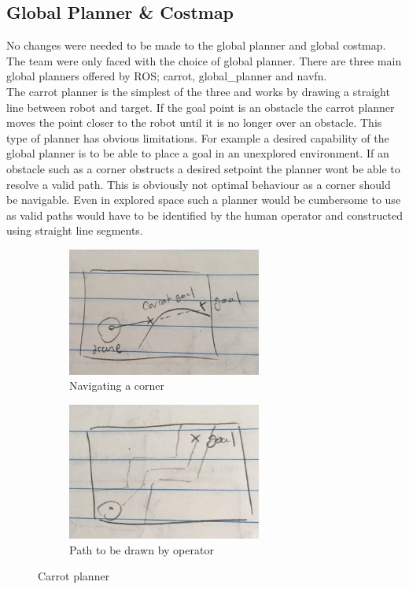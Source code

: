 \documentclass[capstone_report.tex]{subfiles}
\begin{document}
\subsection{Global Planner \& Costmap}

No changes were needed to be made to the global planner and global costmap.  The team were only faced with the choice of global planner.  There are three main global planners offered by ROS; carrot, global\_planner and navfn.\\

The carrot planner is the simplest of the three and works by drawing a straight line between robot and target.  If the goal point is an obstacle the carrot planner moves the point closer to the robot until it is no longer over an obstacle.  This type of planner has obvious limitations.  For example a desired capability of the global planner is to be able to place a goal in an unexplored environment.  If an obstacle such as a corner obstructs a desired setpoint the planner wont be able to resolve a valid path.  This is obviously not optimal behaviour as a corner should be navigable.  Even in explored space such a planner would be cumbersome to use as valid paths would have to be identified by the human operator and constructed using straight line segments.

\begin{figure}[H]
    \centering
    \begin{subfigure}{.5\textwidth}
        \centering
        \includegraphics[width=0.7\textwidth]{imgs/carrot_planner_a.jpg}
        \caption{Navigating a corner}
    \end{subfigure}%
    \begin{subfigure}{.5\textwidth}
        \centering
        \includegraphics[width=0.7\textwidth]{imgs/carrot_planner_b.jpg}
        \caption{Path to be drawn by operator}
    \end{subfigure}
    \caption{Carrot planner\label{fig:carrot}}
\end{figure}
\end{document}
